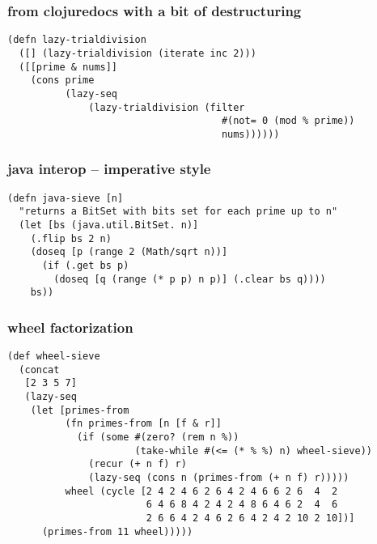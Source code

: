 \documentclass{beamer}
\begin{document}
\begin{frame}[fragile]
\frametitle{from clojuredocs with a bit of destructuring}
\begin{verbatim}
(defn lazy-trialdivision
  ([] (lazy-trialdivision (iterate inc 2)))
  ([[prime & nums]]
    (cons prime
          (lazy-seq
              (lazy-trialdivision (filter
                                     #(not= 0 (mod % prime))
                                     nums))))))
\end{verbatim}

\end{frame}

\begin{frame}[fragile]
\frametitle{java interop -- imperative style}
\begin{verbatim}
(defn java-sieve [n]
  "returns a BitSet with bits set for each prime up to n"
  (let [bs (java.util.BitSet. n)]
    (.flip bs 2 n)
    (doseq [p (range 2 (Math/sqrt n))]
      (if (.get bs p)
        (doseq [q (range (* p p) n p)] (.clear bs q))))
    bs))
\end{verbatim}

\end{frame}

\begin{frame}[fragile]
\frametitle{wheel factorization}
\begin{verbatim}
(def wheel-sieve
  (concat
   [2 3 5 7]
   (lazy-seq
    (let [primes-from
          (fn primes-from [n [f & r]]
            (if (some #(zero? (rem n %))
                      (take-while #(<= (* % %) n) wheel-sieve))
              (recur (+ n f) r)
              (lazy-seq (cons n (primes-from (+ n f) r)))))
          wheel (cycle [2 4 2 4 6 2 6 4 2 4 6 6 2 6  4  2
                        6 4 6 8 4 2 4 2 4 8 6 4 6 2  4  6
                        2 6 6 4 2 4 6 2 6 4 2 4 2 10 2 10])]
      (primes-from 11 wheel)))))
\end{verbatim}
\end{frame}
\end{document}
